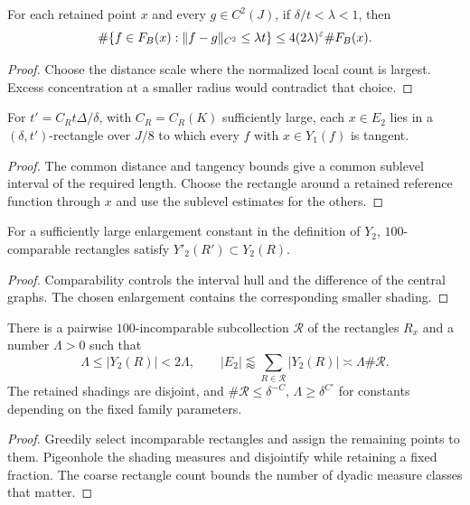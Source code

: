 \begin{lemma}
\label{lem:cinematic-two-ends}
For each retained point $x$ and every $g\in C^2(J)$,
if $\delta/t<\lambda<1$, then
\[
 \#\{f\in F_B(x):\|f-g\|_{C^2}\leq\lambda t\}
               \leq4(2\lambda)^\varepsilon\#F_B(x).
\]
\end{lemma}
\begin{proof}
Choose the distance scale where the normalized local
count is largest. Excess concentration at a smaller
radius would contradict that choice.
\end{proof}

\begin{lemma}
\label{lem:fine-rectangle-assignment}
For $t'=C_Rt\Delta/\delta$, with $C_R=C_R(K)$
sufficiently large, each $x\in E_2$ lies in a
$(\delta,t')$-rectangle over $J/8$ to which every
$f$ with $x\in Y_1(f)$ is tangent.
\end{lemma}
\begin{proof}
The common distance and tangency bounds give a common
sublevel interval of the required length. Choose the
rectangle around a retained reference function through
$x$ and use the sublevel estimates for the others.
\end{proof}

\begin{lemma}
\label{lem:rectangle-shading}
For a sufficiently large enlargement constant in the
definition of $Y_2$, $100$-comparable rectangles satisfy
$Y'_2(R')\subset Y_2(R)$.
\end{lemma}
\begin{proof}
Comparability controls the interval hull and the
difference of the central graphs. The chosen enlargement
contains the corresponding smaller shading.
\end{proof}

\begin{lemma}
\label{lem:fine-rectangle-selection}
There is a pairwise $100$-incomparable subcollection
$\mathcal R$ of the rectangles $R_x$ and a number
$\Lambda>0$ such that
\[
 \Lambda\leq|Y_2(R)|<2\Lambda,\qquad
 |E_2|\lessapprox\sum_{R\in\mathcal R}|Y_2(R)|
                          \asymp\Lambda\#\mathcal R.
\]
The retained shadings are disjoint, and
$\#\mathcal R\leq\delta^{-C}$,
$\Lambda\geq\delta^{C'}$ for constants depending on
the fixed family parameters.
\end{lemma}
\begin{proof}
Greedily select incomparable rectangles and assign the
remaining points to them. Pigeonhole the shading
measures and disjointify while retaining a fixed
fraction. The coarse rectangle count bounds the number
of dyadic measure classes that matter.
\end{proof}

